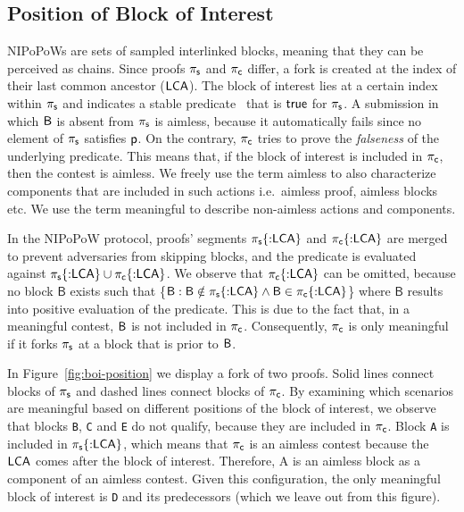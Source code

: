 \subsection{Position of Block of Interest} NIPoPoWs are sets of sampled
interlinked blocks, meaning that they can be perceived as chains. Since proofs
$\mathsf{\pi_{s}}$ and $\mathsf{\pi_{c}}$ differ, a fork is created at the index of
their last common ancestor ($\mathsf{LCA}$). The block of interest lies at a certain
index within $\mathsf{\pi_{s}}$ and indicates a stable predicate~\cite{nipopows,
generic-client} that is $\textsf{true}$ for $\mathsf{\pi_{s}}$. A submission in which $\mathsf{B}$ is
absent from $\mathsf{\pi_{s}}$ is aimless, because it automatically fails since no element
of $\mathsf{\pi_{s}}$ satisfies $\mathsf{p}$. On the contrary, $\mathsf{\pi_{c}}$ tries to prove the
\emph{falseness} of the underlying predicate. This means that, if the block of
interest is included in $\mathsf{\pi_{c}}$, then the contest is aimless. We freely use the
term aimless to also characterize components that are included in such actions
i.e.\ aimless proof, aimless blocks etc. We use the term meaningful to describe
non-aimless actions and components.

\newcommand{\block}{\mathsf{B}}

In the NIPoPoW protocol, proofs' segments $\mathsf{\pi_{s}}\{{{:}}\mathsf{LCA}\}$ and
$\mathsf{\pi_{c}}\{{:}\mathsf{LCA}\}$ are merged to prevent adversaries from skipping
blocks, and the predicate is evaluated against $\mathsf{\pi_{s}}\{{:}\mathsf{LCA}\} \cup
\mathsf{\pi_{c}}\{{:}\mathsf{LCA}\}$. We observe that $\mathsf{\pi_{c}}\{{:}\mathsf{LCA}\}$ can be omitted, because no
block $\block$ exists such that \{$\block : \block \notin \pis\{{:}\lca\} \land
\block \in \pic\{{:}\lca\}$\} where $\block$ results into positive evaluation
of the predicate. This is due to the fact that, in a meaningful contest, $\mathsf{B}$
is not included in $\mathsf{\pi_{c}}$. Consequently, $\mathsf{\pi_{c}}$ is only meaningful if it forks
$\mathsf{\pi_{s}}$ at a block that is prior to $\mathsf{B}$.

\renewcommand{\block}{}

In Figure~\ref{fig:boi-position} we display a fork of two proofs. Solid lines
connect blocks of $\mathsf{\pi_{s}}$ and dashed lines connect blocks of $\mathsf{\pi_{c}}$. By
examining which scenarios are meaningful based on different positions of the
block of interest, we observe that blocks \texttt{B}, \texttt{C} and \texttt{E}
do not qualify, because they are included in $\mathsf{\pi_{c}}$. Block \texttt{A} is
included in $\mathsf{\pi_{s}}\{{:}\mathsf{LCA}\}$, which means that $\mathsf{\pi_{c}}$ is an aimless contest
because the $\mathsf{LCA}$ comes after the block of interest. Therefore, A is an
aimless block as a component of an aimless contest. Given this configuration,
the only meaningful block of interest is \texttt{D} and its predecessors (which
we leave out from this figure).

